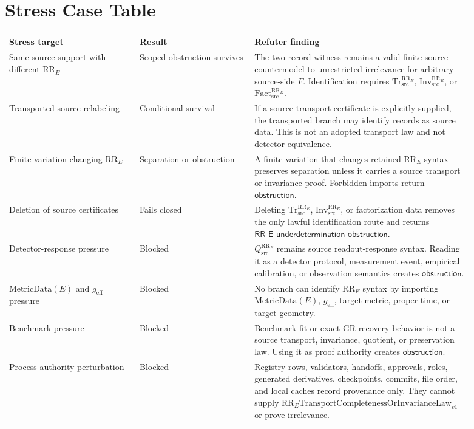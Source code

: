 \documentclass[11pt]{article}
\newcommand{\RRE}{\mathrm{RR}_{E}}
\newcommand{\Qsrc}{Q^{\RRE}_{\mathrm{src}}}
\newcommand{\TrRR}{\mathrm{Tr}^{\RRE}_{\mathrm{src}}}
\newcommand{\InvRR}{\mathrm{Inv}^{\RRE}_{\mathrm{src}}}
\newcommand{\FactRR}{\mathrm{Fact}^{\RRE}_{\mathrm{src}}}
\newcommand{\MetricData}{\mathrm{MetricData}}
\newcommand{\geff}{g_{\mathrm{eff}}}
\newcommand{\Obstruction}{\mathsf{obstruction}}
\newcommand{\RRUnder}{\mathsf{RR\_E\_underdetermination\_obstruction}}
\newcommand{\MissingLaw}{\mathrm{RR}_{E}\mathrm{TransportCompletenessOrInvarianceLaw}_{v1}}
\begin{document}
\section{Stress Case Table}

\begin{longtable}{p{0.25\linewidth}p{0.22\linewidth}p{0.42\linewidth}}
\toprule
Stress target & Result & Refuter finding \\
\midrule
Same source support with different \(\RRE\) &
Scoped obstruction survives &
The two-record witness remains a valid finite source countermodel to
unrestricted irrelevance for arbitrary source-side \(F\). Identification
requires \(\TrRR\), \(\InvRR\), or \(\FactRR\). \\
Transported source relabeling &
Conditional survival &
If a source transport certificate is explicitly supplied, the transported
branch may identify records as source data. This is not an adopted transport
law and not detector equivalence. \\
Finite variation changing \(\RRE\) &
Separation or obstruction &
A finite variation that changes retained \(\RRE\) syntax preserves separation
unless it carries a source transport or invariance proof. Forbidden imports
return \(\Obstruction\). \\
Deletion of source certificates &
Fails closed &
Deleting \(\TrRR\), \(\InvRR\), or factorization data removes the only lawful
identification route and returns \(\RRUnder\). \\
Detector-response pressure &
Blocked &
\(\Qsrc\) remains source readout-response syntax. Reading it as a detector
protocol, measurement event, empirical calibration, or observation semantics
creates \(\Obstruction\). \\
\(\MetricData(E)\) and \(\geff\) pressure &
Blocked &
No branch can identify \(\RRE\) syntax by importing \(\MetricData(E)\),
\(\geff\), target metric, proper time, or target geometry. \\
Benchmark pressure &
Blocked &
Benchmark fit or exact-GR recovery behavior is not a source transport,
invariance, quotient, or preservation law. Using it as proof authority creates
\(\Obstruction\). \\
Process-authority perturbation &
Blocked &
Registry rows, validators, handoffs, approvals, roles, generated derivatives,
checkpoints, commits, file order, and local caches record provenance only.
They cannot supply \(\MissingLaw\) or prove irrelevance. \\
\bottomrule
\end{longtable}
\end{document}
